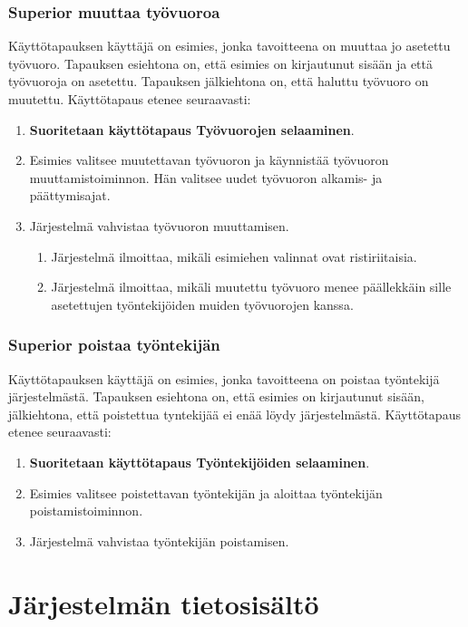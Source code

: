 \documentclass[10pt,titlepage,hidelinks]{scrartcl}
\begin{document}
\subsubsection*{Superior muuttaa työvuoroa}

Käyttötapauksen käyttäjä on esimies, jonka tavoitteena on muuttaa jo asetettu työvuoro. Tapauksen esiehtona on, että esimies on kirjautunut sisään ja että työvuoroja on asetettu. Tapauksen jälkiehtona on, että haluttu työvuoro on muutettu. Käyttötapaus etenee seuraavasti: \begin{enumerate}
\item \textbf{Suoritetaan käyttötapaus Työvuorojen selaaminen}.
\item Esimies valitsee muutettavan työvuoron ja käynnistää työvuoron muuttamistoiminnon. Hän valitsee uudet työvuoron alkamis- ja päättymisajat.
\item Järjestelmä vahvistaa työvuoron muuttamisen. \begin{enumerate}
\item Järjestelmä ilmoittaa, mikäli esimiehen valinnat ovat ristiriitaisia.
\item Järjestelmä ilmoittaa, mikäli muutettu työvuoro menee päällekkäin sille asetettujen työntekijöiden muiden työvuorojen kanssa.
\end{enumerate}
\end{enumerate}

\subsubsection*{Superior poistaa työntekijän}

Käyttötapauksen käyttäjä on esimies, jonka tavoitteena on poistaa työntekijä järjestelmästä. Tapauksen esiehtona on, että esimies on kirjautunut sisään, jälkiehtona, että poistettua tyntekijää ei enää löydy järjestelmästä. Käyttötapaus etenee seuraavasti: \begin{enumerate}
\item \textbf{Suoritetaan käyttötapaus Työntekijöiden selaaminen}.
\item Esimies valitsee poistettavan työntekijän ja aloittaa työntekijän poistamistoiminnon.
\item Järjestelmä vahvistaa työntekijän poistamisen.
\end{enumerate}

\section{Järjestelmän tietosisältö}
\end{document}

